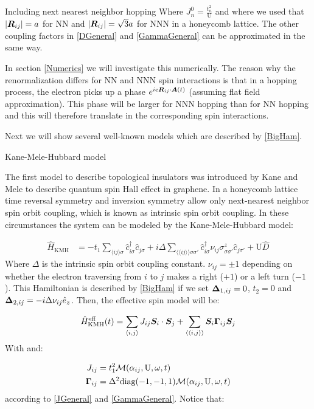 \begin{section}{Including next nearest neighbor hopping}
Where $J_n^0 = \frac{t_n^2}{\text{U}}$ and where we used that $|\boldsymbol{R}_{ij}| = a$ for NN and $|\boldsymbol{R}_{ij}| = \sqrt{3}a$ for NNN in a honeycomb lattice. The other coupling factors in \ref{DGeneral} and \ref{GammaGeneral} can be approximated in the same way.

In section \ref{Numerics} we will investigate this numerically. The reason why the renormalization differs for NN and NNN spin interactions is that in a hopping process, the electron picks up a phase $e^{ie\boldsymbol{R}_{ij}\cdot\boldsymbol{A}(t)}$ (assuming flat field approximation). This phase will be larger for NNN hopping than for NN hopping and this will therefore translate in the corresponding spin interactions.

Next we will show several well-known models which are described by \ref{BigHam}.

\begin{subsection}{Kane-Mele-Hubbard model}

The first model to describe topological insulators was introduced by Kane and Mele \cite{Kane2005} to describe quantum spin Hall effect in graphene. In a honeycomb lattice time reversal symmetry and inversion symmetry allow only next-nearest neighbor spin orbit coupling, which is known as intrinsic spin orbit coupling. In these circumstances the system can be modeled by the Kane-Mele-Hubbard model:

\begin{align}
\label{KMH}
\hat{H}_{\text{KMH}} &= -t_1\sum_{\langle i j \rangle \sigma} \hat{c}^{\dagger}_{i\sigma}\hat{c}_{j\sigma} + i\Delta \sum_{\langle \langle i j \rangle \rangle \sigma \sigma'} \hat{c}^{\dagger}_{i\sigma} \nu_{ij} \sigma^z_{\sigma \sigma'} \hat{c}_{j\sigma'} + \text{U}\hat{D}
\end{align}
Where $\Delta$ is the intrinsic spin orbit coupling constant. $\nu_{ij}=\pm 1$ depending on whether the electron traversing from $i$ to $j$ makes a right ($+1$) or a left turn ($-1$). This Hamiltonian is described by \ref{BigHam} if we set $\boldsymbol{\Delta}_{1,ij} = 0$, $t_2 = 0$ and $\boldsymbol{\Delta}_{2,ij} = -i\Delta \nu_{ij} \hat{e}_z$. Then, the effective spin model will be:

\begin{equation}
\label{KMHeff}
\hat{H}_{\text{KMH}}^{\text{eff}}(t) = \sum_{\langle i,j \rangle} J_{ij} \boldsymbol{S}_i \cdot\boldsymbol{S}_j + \sum_{\langle \langle i,j \rangle \rangle} \boldsymbol{S}_i \boldsymbol{\Gamma}_{ij} \boldsymbol{S}_j 
\end{equation}
With and:

\begin{align*}
J_{ij} &= t_1^2\mathcal{M}(\alpha_{ij}, \text{U}, \omega, t) \\
\boldsymbol{\Gamma}_{ij} &= \Delta^2 \text{diag}(-1,-1,1)\mathcal{M}(\alpha_{ij}, \text{U}, \omega, t)
\end{align*}
according to \ref{JGeneral} and \ref{GammaGeneral}. Notice that:


\end{subsection}
\end{section}
